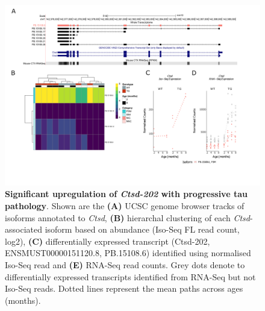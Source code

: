 \begin{landscape}
	\begin{figure}[!htp]
		\centering
		\includegraphics[page=1,trim={1.5cm 2.5cm 2cm 2cm}, scale = 0.85]{Figures/Ch5_DiffPlots_Landscape.pdf}
		\captionsetup{width=1.5\textwidth}
		\caption[Differential Isoform Expression: \textit{Ctsd}]%
		{\textbf{Significant upregulation of \textit{Ctsd-202} with progressive tau pathology}. Shown are the \textbf{(A)} UCSC genome browser tracks of isoforms annotated to \textit{Ctsd}, \textbf{(B)} hierarchal clustering of each \textit{Ctsd}-associated isoform based on abundance (Iso-Seq FL read count, log2), \textbf{(C)} differentially expressed transcript (Ctsd-202, ENSMUST00000151120.8, PB.15108.6) identified using normalised Iso-Seq read and \textbf{(E)} RNA-Seq read counts. Grey dots denote to differentially expressed transcripts identified from RNA-Seq but not Iso-Seq reads. Dotted lines represent the mean paths across ages (months).}   
		\label{fig:Ctsd}
	\end{figure}	
\end{landscape}

